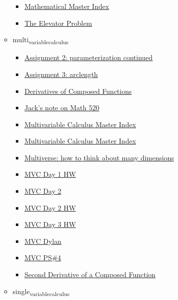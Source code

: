 \documentclass[11pt]{article}
\begin{document}
\begin{itemize}
\begin{itemize}
\begin{itemize}
\item \href{mathematics/mathematical\_modeling/KBxMathModMasterIndex.org}{Mathematical Master Index}
\item \href{mathematics/mathematical\_modeling/KBxTheElevatorProblem.org}{The Elevator Problem}
\end{itemize}
\item multi\textsubscript{variable}\textsubscript{calculus}
\begin{itemize}
\item \href{mathematics/multi\_variable\_calculus/KBe21math520retAssignment2.org}{Assignment 2: parameterization continued}
\item \href{mathematics/multi\_variable\_calculus/KBe21math520retAssign3.org}{Assignment 3: arclength}
\item \href{mathematics/multi\_variable\_calculus/KBrefDerivativesOfComposedFunctions.org}{Derivatives of Composed Functions}
\item \href{mathematics/multi\_variable\_calculus/KBhMATH520Jack.org}{Jack's note on Math 520}
\item \href{mathematics/multi\_variable\_calculus/index.org}{Multivariable Calculus Master Index}
\item \href{mathematics/multi\_variable\_calculus/KBMATH520MasterIndex.org}{Multivariable Calculus Master Index}
\item \href{mathematics/multi\_variable\_calculus/KBrefLeonardsMultiDimensionalMultiverse.org}{Multiverse: how to think about many dimensions}
\item \href{mathematics/multi\_variable\_calculus/KBdMATH520Day1HW.org}{MVC Day 1 HW}
\item \href{mathematics/multi\_variable\_calculus/KBdMATH520Day2.org}{MVC Day 2}
\item \href{mathematics/multi\_variable\_calculus/KBdMATH520Day2HW.org}{MVC Day 2 HW}
\item \href{mathematics/multi\_variable\_calculus/KBdMATH520Day3HW.org}{MVC Day 3 HW}
\item \href{mathematics/multi\_variable\_calculus/KBdMATH520Dylan.org}{MVC Dylan}
\item \href{mathematics/multi\_variable\_calculus/KBdMATH520PS4.org}{MVC PS\#4}
\item \href{mathematics/multi\_variable\_calculus/KBrefSecondDerivativeOfComposedFunctions.org}{Second Derivative of a Composed Function}
\end{itemize}
\item single\textsubscript{variable}\textsubscript{calculus}

\end{itemize}
\end{itemize}
\end{document}
